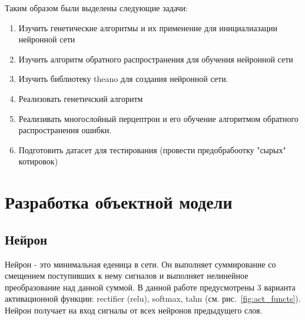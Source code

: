 \documentclass[a4paper,12pt]{article}
\begin{document}
\par Таким образом были выделены следующие задачи:
\begin{enumerate}
\item Изучить генетические алгоритмы и их применение для инициалиазации нейронной сети
\item Изучить алгоритм обратного распространения для обучения нейронной сети
\item Изучить библиотеку theano для создания нейронной сети.
\item Реализовать генетичский алгоритм
\item Реализивать многослойный перцептрон и его обучение алгоритмом обратного распространения ошибки.
\item Подготовить датасет для тестирования (провести предобрабоотку "сырых" котировок)
\end{enumerate}

\newpage\section{Разработка объектной модели}

\subsection{Нейрон}
Нейрон - это минимальная еденица в сети. Он выполняет суммирование со смещением поступивших к нему сигналов и выполняет нелинейное преобразование над данной суммой. В данной работе предусмотрены 3 варианта активационной функции: rectifier (relu), softmax, tahn (см. рис.~\ref{fig:act_functs}). Нейрон получает на вход сигналы от всех нейронов предыдущего слоя.
\end{document}

